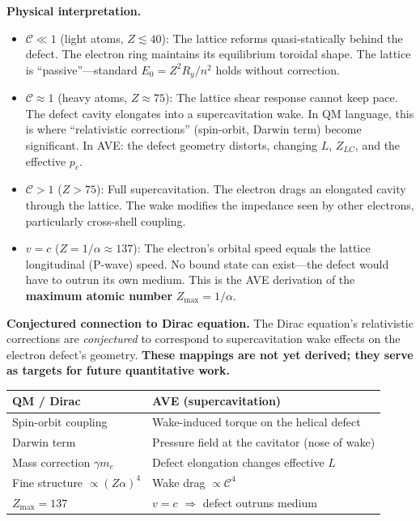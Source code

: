 \noindent\textbf{Physical interpretation.}
\begin{itemize}
\item $\mathcal{C} \ll 1$ (light atoms, $Z \lesssim 40$):
      The lattice reforms quasi-statically behind the defect.
      The electron ring maintains its equilibrium toroidal
      shape.  The lattice is ``passive''---standard
      $E_0 = Z^2 R_y / n^2$ holds without correction.
\item $\mathcal{C} \approx 1$ (heavy atoms, $Z \approx 75$):
      The lattice shear response cannot keep pace.
      The defect cavity elongates into a
      supercavitation wake.  In QM language, this is
      where ``relativistic corrections'' (spin-orbit,
      Darwin term) become significant.  In AVE: the
      defect geometry distorts, changing $L$, $Z_{LC}$,
      and the effective $p_c$.
\item $\mathcal{C} > 1$ ($Z > 75$):
      Full supercavitation.  The electron drags an
      elongated cavity through the lattice.  The wake
      modifies the impedance seen by other electrons,
      particularly cross-shell coupling.
\item $v = c$ ($Z = 1/\alpha \approx 137$):
      The electron's orbital speed equals the lattice
      longitudinal (P-wave) speed.  No bound state can
      exist---the defect would have to outrun its own
      medium.  This is the AVE derivation of the
      \textbf{maximum atomic number} $Z_{\max} = 1/\alpha$.
\end{itemize}

\noindent\textbf{Conjectured connection to Dirac equation.}
The Dirac equation's relativistic corrections are
\emph{conjectured} to correspond to supercavitation wake
effects on the electron defect's geometry.
\textbf{These mappings are not yet derived; they serve as
targets for future quantitative work.}
\begin{center}
\small
\begin{tabular}{ll}
\hline
\textbf{QM / Dirac} & \textbf{AVE (supercavitation)} \\
\hline
Spin-orbit coupling
    & Wake-induced torque on the helical defect \\
Darwin term
    & Pressure field at the cavitator (nose of wake) \\
Mass correction $\gamma m_e$
    & Defect elongation changes effective $L$ \\
Fine structure $\propto (Z\alpha)^4$
    & Wake drag $\propto \mathcal{C}^4$ \\
$Z_{\max} = 137$
    & $v = c$ $\Rightarrow$ defect outruns medium \\
\hline
\end{tabular}
\end{center}

